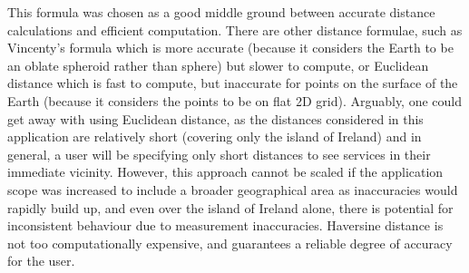 \documentclass[a4paper,11pt]{report}
\begin{document}
This formula was chosen as a good middle ground between accurate distance calculations and efficient computation.
There are other distance formulae, such as Vincenty's formula\supercite{vincenty1975geodesics} which is more accurate (because it considers the Earth to be an oblate spheroid rather than sphere) but slower to compute, or Euclidean distance\supercite{smith2013precalculus} which is fast to compute, but inaccurate for points on the surface of the Earth (because it considers the points to be on flat 2D grid).
Arguably, one could get away with using Euclidean distance, as the distances considered in this application are relatively short (covering only the island of Ireland) and in general, a user will be specifying only short distances to see services in their immediate vicinity.
However, this approach cannot be scaled if the application scope was increased to include a broader geographical area as inaccuracies would rapidly build up, and even over the island of Ireland alone, there is potential for inconsistent behaviour due to measurement inaccuracies.  
Haversine distance is not too computationally expensive, and guarantees a reliable degree of accuracy for the user.
\end{document}
